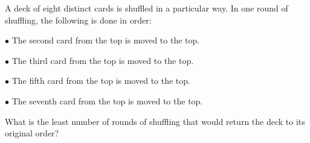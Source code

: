 A deck of eight distinct cards is shuffled in a particular way. In one round of shuffling, the following is done in order:

$\bullet$ The second card from the top is moved to the top.

$\bullet$  The third card from the top is moved to the top.

$\bullet$  The fifth card from the top is moved to the top.

$\bullet$  The seventh card from the top is moved to the top.

What is the least number of rounds of shuffling that would return the deck to its original order?
